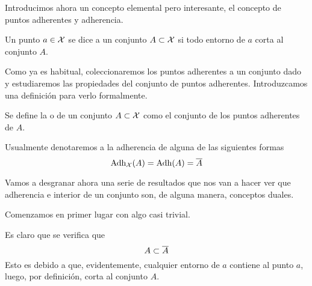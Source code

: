 Introducimos ahora un concepto elemental pero interesante, el concepto de puntos adherentes y adherencia.
\begin{defi}
	\label{etop_defi_puntoAdherente}
	Un punto $a\in\mathcal{X}$ se dice  a un conjunto $A\subset\mathcal{X}$ si todo entorno de $a$ corta al conjunto $A$.
\end{defi}
Como ya es habitual, coleccionaremos los puntos adherentes a un conjunto dado y estudiaremos las propiedades del conjunto de puntos adherentes. Introduzcamos una definición para verlo formalmente.
\begin{defi}[Adherencia]
	\label{etop_defi_adherencia}
	Se define la  o  de un conjunto $A\subset\mathcal{X}$ como el conjunto de los puntos adherentes de $A$.
\end{defi}

Usualmente denotaremos a la adherencia de alguna de las siguientes formas
\begin{equation}
\label{etop_eq_adherencia}
\operatorname{\mathrm{Adh}}_{\mathcal{X}}(A)=\operatorname{\mathrm{Adh}}(A)=\overline{A}
\end{equation}

Vamos a desgranar ahora una serie de resultados que nos van a hacer ver que adherencia e interior de un conjunto son, de alguna manera, conceptos duales.

Comenzamos en primer lugar con algo casi trivial.
\begin{obs}
	\label{etop_obs_adherenciaConjunto}
	Es claro que se verifica que
	\begin{equation}
	\label{etop_eq_adherenciaConjunto}
	A\subset\overline{A}
	\end{equation}
	Esto es debido a que, evidentemente, cualquier entorno de $a$ contiene al punto $a$, luego, por definición, corta al conjunto $A$.
\end{obs}


